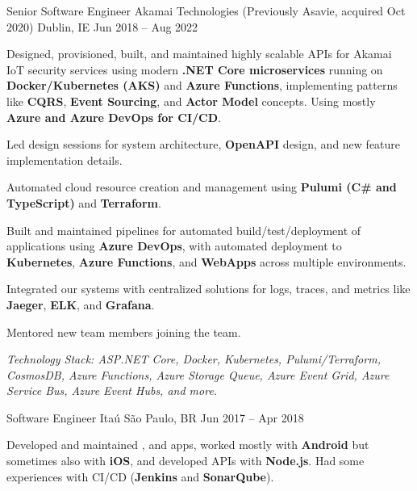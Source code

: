 \documentclass[]{awesome-cv}
\begin{document}
\begin{cventries}
	\cventry
	{Senior Software Engineer}
	{Akamai Technologies (Previously Asavie, acquired Oct 2020)}
	{Dublin, IE}
	{Jun 2018 – Aug 2022}
	{\begin{cvitems}
		\item {Designed, provisioned, built, and maintained highly scalable APIs for Akamai IoT security services using modern \textbf{.NET Core microservices} running on \textbf{Docker/Kubernetes (AKS)} and \textbf{Azure Functions}, implementing patterns like \textbf{CQRS}, \textbf{Event Sourcing}, and \textbf{Actor Model} concepts. Using mostly \textbf{Azure and Azure DevOps for CI/CD}.}
		\item {Led design sessions for system architecture, \textbf{OpenAPI} design, and new feature implementation details.}
		\item {Automated cloud resource creation and management using \textbf{Pulumi (C\# and TypeScript)} and \textbf{Terraform}.}
		\item {Built and maintained pipelines for automated build/test/deployment of applications using \textbf{Azure DevOps}, with automated deployment to \textbf{Kubernetes}, \textbf{Azure Functions}, and \textbf{WebApps} across multiple environments.}
		\item {Integrated our systems with centralized solutions for logs, traces, and metrics like \textbf{Jaeger}, \textbf{ELK}, and \textbf{Grafana}.}
		\item {Mentored new team members joining the team.}
		\item \textit{Technology Stack: ASP.NET Core, Docker, Kubernetes, Pulumi/Terraform, CosmosDB, Azure Functions, Azure Storage Queue, Azure Event Grid, Azure Service Bus, Azure Event Hubs, and more.}
		\end{cvitems}}
	\cventry
	{Software Engineer}
	{Itaú}
	{São Paulo, BR}
	{Jun 2017 – Apr 2018}
	{\begin{cvitems}
		\item {Developed and maintained \href{https://play.google.com/store/apps/details?id=com.itau}{\color{darkblue}{Banco Itaú}}, \href{https://play.google.com/store/apps/details?id=com.itaucard.activity}{\color{darkblue}{ItaúCard}} and \href{https://play.google.com/store/apps/details?id=com.itau.iti}{\color{darkblue}{ITI}} apps, worked mostly with \textbf{Android} but sometimes also with \textbf{iOS}, and developed API\textquotesingle{}s with \textbf{Node.js}. Had some experiences with CI/CD (\textbf{Jenkins} and \textbf{SonarQube}).}

\end{cvitems}}
\end{cventries}
\end{document}
